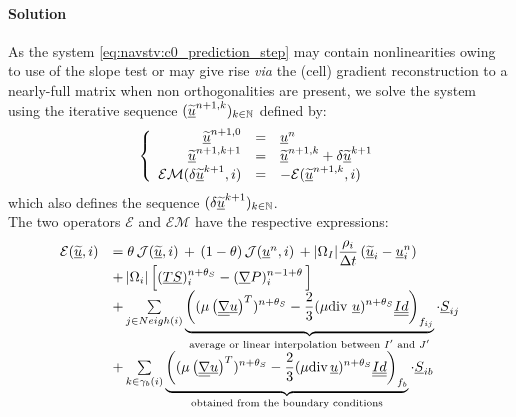 \paragraph{Solution\\}
As the system \eqref{eq:navstv:c0_prediction_step} may contain nonlinearities
owing to use of the slope test or may give rise {\it via} the (cell) gradient
reconstruction to a nearly-full matrix when non orthogonalities are present,
we solve the system using the iterative sequence
$(\underline{\widetilde{u}}^{n+1,k})_{k\in \mathbb{N}}$ defined by:
\begin{equation}
\left\{
\begin{array}{r c l}
\underline{\widetilde{u}}^{n+1,0} & = & \underline{u}^{n}\\
\underline{\widetilde{u}}^{n+1,k+1} & =& \underline{\widetilde{u}}^{n+1,k} + \delta\underline{\widetilde{u}}^{k+1}\\
\mathcal{EM}(\delta\underline{\widetilde{u}}^{k+1}, i) & =& -\mathcal{E}(\underline{\widetilde{u}}^{n+1,k}, i) \\
\end{array}\right.
\end{equation}
which also defines the sequence $(\delta\underline{\widetilde{u}}^{k+1})
_{k\in \mathbb{N}}$.\\
The two operators $\mathcal{E}$ and $\mathcal{EM}$ have the respective
expressions:
\begin{equation}\label{eq:navstv:exact_prediction_step}
\begin{array}{ll}
\mathcal{E}(\underline{\widetilde{u}}, i) &= \theta\, \mathcal{J}(\underline{\widetilde{u}}, i)\,+\,(1-\theta)\,\mathcal{J}(\underline{u}^{n}, i)\,+ |{\Omega_I}|\displaystyle\frac{\rho_i}{\Delta t}\,(\underline{\widetilde{u}}_{i}-\underline{u}^n_{i}) \\
& +\,|{\Omega_{i}}|\left[(\underline{TS})^{n+\theta_{S}}_i-(\underline{\nabla}{P})^{n-1+\theta}_i \, \right]\\
&+\sum\limits_{j \in Neigh(i)}{ \underbrace{\left(( \mu \left(\underline{\underline{\nabla}}\underline{u}\right)^T)^{n+\theta_{S}}- \frac{2}{3} ( \mu \text{div}\,\,\underline{u})^{n+\theta_{S}}\underline{\underline{Id}}\right)_{{f_{ij}}}}_{\text{average or linear interpolation between ${I^\prime}$ and ${J^\prime}$}} \cdot \underline{S}_{{ij}}}\\
&+\sum\limits_{k\in {\gamma_b(i)}}{ \underbrace{\left(( \mu \left( \underline{\underline{\nabla}}\underline{u}\right)^T )^{n+\theta_{S}}- \frac{2}{3} ( \mu \text{div}\, \underline{u})^{n+\theta_{S}}\underline{\underline{Id}}\right)_{{f_{b}}}}_\text{obtained from the boundary conditions} \cdot \underline{S}_{{ib}}}\\
\end{array}
\end{equation}
